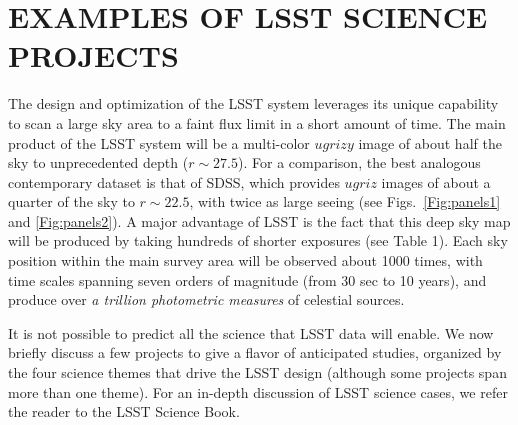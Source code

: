 \documentclass{emulateapj}
\newcommand{\B}[1]{{#1}}
\begin{document}
\section{                EXAMPLES OF LSST SCIENCE PROJECTS                    }
\label{Sec:science}


The design and optimization of the LSST system leverages its unique capability 
to scan a large sky area to a faint flux limit in a short amount of time. 
The main product of the LSST system will be a multi-color $ugrizy$ image of about 
half the sky to unprecedented depth ($r\sim27.5$). For a comparison, the best 
analogous contemporary dataset is that of SDSS, which provides $ugriz$ images
of about a quarter of the sky to $r\sim22.5$, with twice as large seeing
(see Figs.~\ref{Fig:panels1} and \ref{Fig:panels2}). A major advantage of LSST 
is the fact that this deep sky map will be produced by taking hundreds of
shorter exposures (see Table 1). Each sky position within the main survey area 
will be observed about 1000 times, with time scales spanning seven orders of 
magnitude (from 30 sec to 10 years), and produce over {\it a trillion 
photometric measures} of celestial sources.

It is not possible to predict all the science that LSST data will enable.
We now briefly discuss a few projects to give a flavor of anticipated studies,
organized by the four science themes that drive the LSST design 
(although some projects span more than one theme). 
\B{For an in-depth discussion of LSST science cases, we refer the reader to the 
LSST Science Book.}
 
\end{document}
